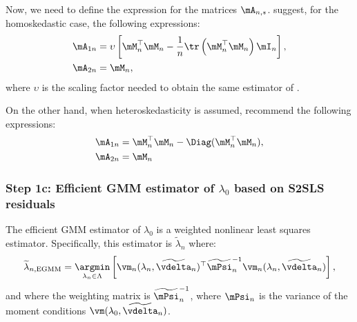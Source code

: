 \documentclass[english,12pt]{book}\usepackage[]{graphicx}\usepackage[]{xcolor}
\begin{document}
Now, we need to define the expression for the matrices $\mA_{n,s}$. \cite{drukker2013two} suggest, for the homoskedastic case, the following expressions:
\begin{equation*}
  \begin{aligned}
    \mA_{1n} & = \upsilon \left[\mM^\top_n\mM_n - \frac{1}{n}\tr\left(\mM^\top_n\mM_n\right)\mI_n\right],\\ 
    \mA_{2n} & = \mM_n,
  \end{aligned}
\end{equation*}
%
where $\upsilon$ is the scaling factor needed to obtain the same estimator of \cite{kelejian1998generalized, kelejian1999generalized}. 

On the other hand, when heteroskedasticity is assumed, \cite{kelejian2010specification} recommend the following expressions:
\begin{equation*}
\begin{aligned}
\mA_{1n} & = \mM^\top_n\mM_n  - \Diag(\mM^\top_n\mM_n), \\
\mA_{2n} & = \mM_n
\end{aligned}
\end{equation*}


\subsubsection{Step 1c: Efficient GMM estimator of $\lambda_0$ based on S2SLS residuals}

The efficient GMM estimator of $\lambda_0$ is a weighted nonlinear least squares estimator. Specifically, this estimator is $\widetilde{\lambda}_n$ where:
\begin{equation}\label{eq:nonlinear-gmm-lambda}
\widetilde{\lambda}_{n, \textrm{EGMM}} = \underset{\lambda_n \in \Lambda}{\argmin} \left[\vm_n(\lambda_n,\widetilde{\vdelta}_n)^\top\widetilde{\mPsi}^{-1}_n\vm_n(\lambda_n,\widetilde{\vdelta}_n) \right],
\end{equation}
%
and where the weighting matrix is $\widetilde{\mPsi}^{-1}_n$, where $\mPsi_n$ is the variance of the moment conditions $\vm(\lambda_0,\widetilde{\vdelta}_n)$. 
\end{document}
